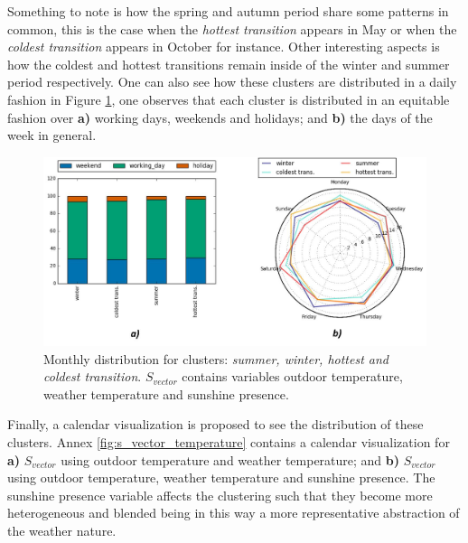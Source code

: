 Something to note is how the spring and autumn period share some patterns in common, this is the case when the \textit{hottest transition} appears in May or when the \textit{coldest transition} appears in October for instance. Other interesting aspects is how the coldest and hottest transitions remain inside of the winter and summer period respectively. One can also see how these clusters are distributed in a daily fashion in Figure \ref{fig:daily}, one observes that each cluster is distributed in an equitable fashion over \textbf{a)} working days, weekends and holidays; and \textbf{b)} the days of the week in general.   

\begin{figure}[h!]
  \vspace{0.5em} %
  \includegraphics[scale=0.65]{Figures/daily_distribution_season.jpg}
  \caption{Monthly distribution for clusters: \textit{summer, winter, hottest and coldest transition}. $S_{vector}$ contains variables outdoor temperature, weather temperature and sunshine presence.}
  \label{fig:daily}
\end{figure} 

Finally, a calendar visualization is proposed to see the distribution of these clusters. Annex \ref{fig:s_vector_temperature} contains a calendar visualization for \textbf{a)} $S_{vector}$ using outdoor temperature and weather temperature; and \textbf{b)} $S_{vector}$ using outdoor temperature, weather temperature and sunshine presence. The sunshine presence variable affects the clustering such that they become more heterogeneous and blended being in this way a more representative abstraction of the weather nature.  

